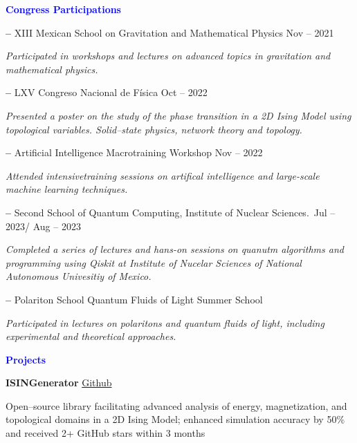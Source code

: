 \documentclass[10pt]{article}
\begin{document}
\vspace{12pt}

\vspace{12pt}
\begin{center}
    \textbf{\textcolor{blue}{Congress Participations}}
\end{center}
\vspace{12pt}

\textbf{–} XIII Mexican School on Gravitation and Mathematical Physics \hfill Nov – 2021

\textit{Participated in workshops and lectures on advanced topics in gravitation and mathematical physics.}

\textbf{–} LXV Congreso Nacional de Física \hfill Oct – 2022

\textit{Presented a poster on the study of the phase transition in a 2D Ising Model using topological variables. Solid–state physics, network theory and topology.}

\textbf{–} Artificial Intelligence Macrotraining Workshop \hfill Nov – 2022

\textit{Attended intensivetraining sessions on artifical intelligence and large-scale machine learning techniques.}

\textbf{–} Second School of Quantum Computing, Institute of Nuclear Sciences.\ \hfill Jul – 2023/ Aug – 2023

\textit{Completed a series of lectures and hans-on sessions on quanutm algorithms and programming using Qiskit at Institute of Nucelar Sciences of National Autonomous Univesitiy of Mexico.}

\textbf{–} Polariton School Quantum Fluids of Light Summer School \hfill

\textit{Participated in lectures on polaritons and quantum fluids of light, including experimental and theoretical approaches.}

\vspace{12pt}

\begin{center}
    \textbf{\textcolor{blue}{Projects}}
\end{center}
\vspace{12pt}
\textbf{ISINGenerator} \hfill \href{https://github.com/erick-rios/ISINGenerator}{Github}

Open–source library facilitating advanced analysis of energy, magnetization, and topological domains in a 2D Ising Model; enhanced simulation accuracy by 50\% and received 2+ GitHub stars within 3 months
\end{document}
